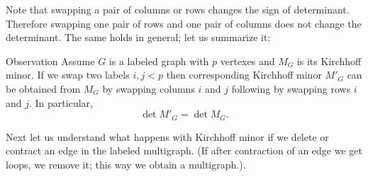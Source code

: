 Note that swapping a pair of columns or rows changes the sign of determinant.
Therefore swapping one pair of rows and one pair of columns does not change the determinant.
The same holds in general; let us summarize it:

\begin{thm}{Observation}\label{observaiton:swap}
Assume $G$ is a labeled graph with $p$ vertexes and $M_G$ is its Kirchhoff minor.
If we swap two labels $i,j<p$ then corresponding Kirchhoff minor $M'_G$ can be obtained from $M_G$ by swapping columns $i$ and $j$ following by swapping rows $i$ and $j$.
In particular, 
\[\det M'_G=\det M_G.\]

\end{thm}

Next let us understand what happens with Kirchhoff minor if we delete or contract an edge in the labeled multigraph.
(If after contraction of an edge we get loops, we remove it; this way we obtain a multigraph.). 

